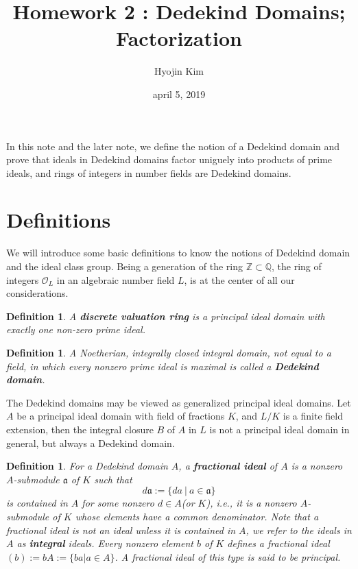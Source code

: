 \documentclass[11pt,a4paper,reqno]{amsart}
\numberwithin{equation}{section}
\newtheorem{defn}[thm]{Definition}
\begin{document}
 


\title{Homework 2 : Dedekind Domains; Factorization} 
\author{Hyojin Kim} 
\date{april 5, 2019} 
\maketitle 
In this note and the later note, we define the notion of a Dedekind domain and prove that
ideals in Dedekind domains factor uniguely into products of prime ideals, and 
rings of integers in number fields are Dedekind domains.

\section{Definitions} 
We will introduce some basic definitions to know the notions of Dedekind domain and the ideal class group. 
Being a generation of the ring $\mathbb{Z} \subset \mathbb{Q}$, 
the ring of integers $\mathcal{O}_L$ in an algebraic number field $L$, is at the center of all our considerations.

\begin{defn}
A \textbf{discrete valuation ring} is a principal ideal domain with exactly one non-zero prime ideal.
\end{defn}

\begin{defn}
A Noetherian, integrally closed integral domain, not equal to a field, 
in which every nonzero prime ideal is maximal is called a \textbf{Dedekind domain}.
\end{defn}

The Dedekind domains may be viewed as generalized principal ideal domains. 
Let $A$ be a principal ideal domain with field of fractions $K$, and $L/K$ is a finite field extension, 
then the integral closure $B$ of $A$ in $L$ is not a principal ideal domain in general,
but always a Dedekind domain.

\begin{defn}
For a Dedekind domain $A$, a \textbf{fractional ideal} of $A$ is a nonzero $A$-submodule $\mathfrak{a}$ of $K$ such that
\[
d\mathfrak{a}:= \{da~|~a\in \mathfrak{a} \}
\]
is contained in $A$ for some nonzero $d \in A$(or $K$),
i.e., it is a nonzero $A$-submodule of $K$ whose elements have a common denominator.
Note that a fractional ideal is not an ideal unless it is contained in $A$, 
we refer to the ideals in $A$ as \textbf{integral} ideals.
Every nonzero element $b$ of $K$ defines a fractional ideal $(b):=bA:=\{ba|a \in A \}$. 
A fractional ideal of this type is said to be principal.
\end{defn}
\end{document}
